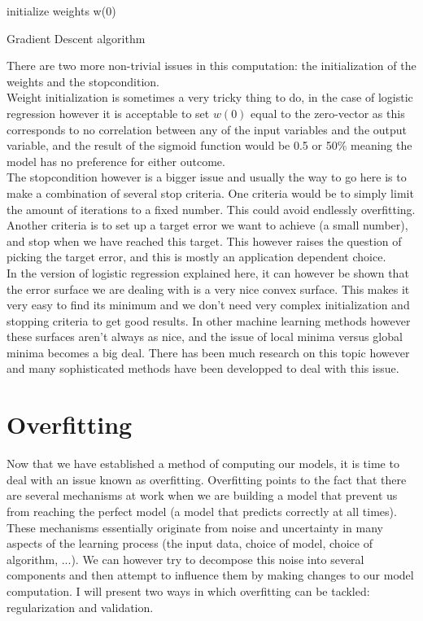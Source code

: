 \begin{algorithm}[H]
	initialize weights w(0) \\
\caption{Gradient Descent algorithm}
\end{algorithm}
There are two more non-trivial issues in this computation: the initialization of the weights and the stopcondition. \\
Weight initialization is sometimes a very tricky thing to do, in the case of logistic regression however it is acceptable to set $w(0)$ equal to the zero-vector as this corresponds to no correlation between any of the input variables and the output variable, and the result of the sigmoid function would be 0.5 or 50\% meaning the model has no preference for either outcome.\\
The stopcondition however is a bigger issue and usually the way to go here is to make a combination of several stop criteria. One criteria would be to simply limit the amount of iterations to a fixed number. This could avoid endlessly overfitting. Another criteria is to set up a target error we want to achieve (a small number), and stop when we have reached this target. This however raises the question of picking the target error, and this is mostly an application dependent choice. \\
In the version of logistic regression explained here, it can however be shown that the error surface we are dealing with is a very nice convex surface. This makes it very easy to find its minimum and we don't need very complex initialization and stopping criteria to get good results. In other machine learning methods however these surfaces aren't always as nice, and the issue of local minima versus global minima becomes a big deal. There has been much research on this topic however and many sophisticated methods have been developped to deal with this issue.

\section{Overfitting}
Now that we have established a method of computing our models, it is time to deal with an issue known as overfitting. Overfitting points to the fact that there are several mechanisms at work when we are building a model that prevent us from reaching the perfect model (a model that predicts correctly at all times). These mechanisms essentially originate from noise and uncertainty in many aspects of the learning process (the input data, choice of model, choice of algorithm, ...). We can however try to decompose this noise into several components and then attempt to influence them by making changes to our model computation. I will present two ways in which overfitting can be tackled: regularization and validation.

